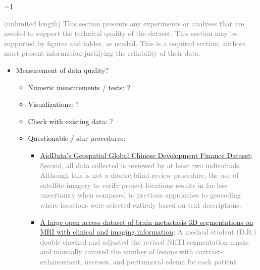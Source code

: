 \documentclass[fleqn,10pt]{wlscirep}
\newcommand{\ifinstruction}{0} %
\begin{document}
\ifnum \ifinstruction=1

\textcolor{gray}{(unlimited length) This section presents any experiments or analyses that are needed to support the technical quality of the dataset. This section may be supported by figures and tables, as needed. This is a required section; authors must present information justifying the reliability of their data.}

\begin{itemize}
  \item
  Measurement of data quality?
  
  \begin{itemize}
    \item
    Numeric measurements / tests: ?
    
    \item
    Visualizations: ?
    
    \item
    Check with existing data: ?
    
    \item
    Questionable / slur procedures:
      
      \begin{itemize}
      \item
      \href{https://www.nature.com/articles/s41597-024-03341-w?_gl=1*5ya8g2*_up*MQ..&gclid=EAIaIQobChMInOXO84DVhgMViewWBR3vWQJAEAAYASAAEgJICfD_BwE#Sec28}{AidData’s Geospatial Global Chinese Development Finance Dataset}: \textcolor{gray}{Second, all data collected is reviewed by at least two individuals. Although this is not a double-blind review procedure, the use of satellite imagery to verify project locations results in far less uncertainty when compared to previous approaches to geocoding where locations were selected entirely based on text descriptions.}
      
      \item
      \href{https://www.nature.com/articles/s41597-024-03021-9?_gl=1*1u1zppx*_up*MQ..&gclid=EAIaIQobChMInOXO84DVhgMViewWBR3vWQJAEAAYASAAEgJICfD_BwE#Sec9}{A large open access dataset of brain metastasis 3D segmentations on MRI with clinical and imaging information}: \textcolor{gray}{A medical student (D.R.) double checked and adjusted the revised NIfTI segmentation masks and manually counted the number of lesions with contrast-enhancement, necrosis, and peritumoral edema for each patient.}
      

\end{itemize}
\end{itemize}
\end{itemize}
\end{document}
